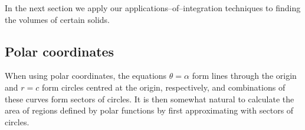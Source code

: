 %
%
%
%
%
%
%

In the next section we apply our applications--of--integration techniques to finding the volumes of certain solids.

\subsection{Polar coordinates}
\checkoddpage
{}
When using polar coordinates, the equations $\theta=\alpha$ form lines through the origin and $r=c$ form circles centred at the origin, respectively, and combinations of these curves form sectors of circles. It is then somewhat natural to calculate the area of regions defined by polar functions by first approximating with sectors of circles. 

